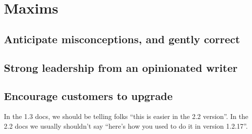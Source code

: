 \chapter{Maxims}

\section{Anticipate misconceptions, and gently correct}

\section{Strong leadership from an opinionated writer}

\section{Encourage customers to upgrade}

In the 1.3 docs, we should be telling folks ``this is easier in the 2.2
version''. In the 2.2 docs we usually shouldn't say ``here's how you
used to do it in version 1.2.17''.

